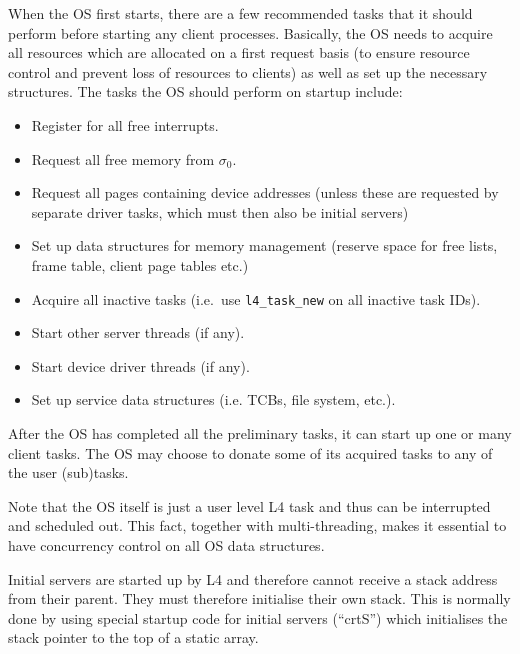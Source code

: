 
When the OS first starts, there are a few recommended tasks that it
should perform before starting any client processes. Basically, the OS
needs to acquire all resources which are allocated on a first request
basis (to ensure resource control and prevent loss of resources to
clients) as well as set up the necessary structures. The tasks the OS
should perform on startup include:

\begin{itemize}

\item Register for all free interrupts.

\item Request all free memory from $\sigma_0$.

\item Request all pages containing device addresses (unless these are
  requested by separate driver tasks, which must then also be initial
  servers)

\item Set up data structures for memory management (reserve space for
  free lists, frame table, client page tables etc.)

\item Acquire all inactive tasks (i.e.\ use {\footnotesize\verb+l4_task_new+} on all
  inactive task IDs).

\item Start other server threads (if any).

\item Start device driver threads (if any).

\item Set up service data structures (i.e. TCBs, file system, etc.).

\end{itemize}

After the OS has completed all the preliminary tasks, it can start up
one or many client tasks. The OS may choose to donate some of its
acquired tasks to any of the user (sub)tasks.

Note that the OS itself is just a user level L4 task and thus can be
interrupted and scheduled out. This fact, together with
multi-threading, makes it essential to have concurrency control on all
OS data structures.

Initial servers are started up by L4 and therefore cannot receive a
stack address from their parent. They must therefore initialise their
own stack. This is normally done by using special startup code for
initial servers (``crtS'') which initialises the stack pointer to the
top of a static array.

